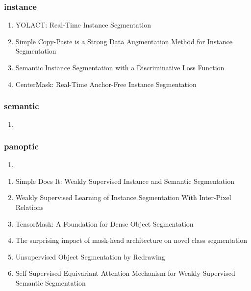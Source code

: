 \documentclass[acmlarge]{acmart}
\begin{document}
		\subsubsection{instance}
		\begin{enumerate}
			\item YOLACT: Real-Time Instance Segmentation \cite{Bolya2019YOLACTRI} 

			\item Simple Copy-Paste is a Strong Data Augmentation Method for Instance Segmentation \cite{Ghiasi2021SimpleCI} 

			\item Semantic Instance Segmentation with a Discriminative Loss Function \cite{Brabandere2017SemanticIS} 

			\item CenterMask: Real-Time Anchor-Free Instance Segmentation \cite{Lee2020CenterMaskRA} 

		\end{enumerate}
		\subsubsection{semantic}
		\begin{enumerate}
			\item
		\end{enumerate}
		\subsubsection{panoptic}
		\begin{enumerate}
			\item
		\end{enumerate}
	\begin{enumerate}
		\item Simple Does It: Weakly Supervised Instance and Semantic Segmentation \cite{Khoreva2017SimpleDI} 

		\item Weakly Supervised Learning of Instance Segmentation With Inter-Pixel Relations \cite{Ahn2019WeaklySL} 

		\item TensorMask: A Foundation for Dense Object Segmentation \cite{Chen2019TensorMaskAF} 

		\item The surprising impact of mask-head architecture on novel class segmentation \cite{Birodkar2021TheSI} 

		\item Unsupervised Object Segmentation by Redrawing \cite{Chen2019UnsupervisedOS} 

		\item Self-Supervised Equivariant Attention Mechanism for Weakly Supervised Semantic Segmentation \cite{Wang2020SelfSupervisedEA} 

	\end{enumerate}
\end{document}
